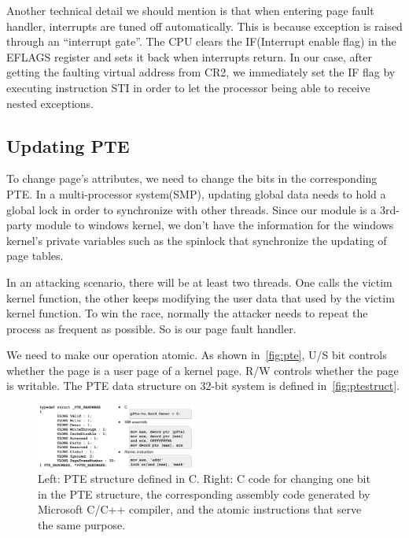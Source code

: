 Another technical detail we should mention is that when entering page fault handler, interrupts are tuned off automatically. This is because exception is raised through an ``interrupt gate''. The CPU clears the IF(Interrupt enable flag) in the EFLAGS register and sets it back when interrupts return. In our case, after getting the faulting virtual address from CR2, we immediately set the IF flag by executing instruction STI in order to let the processor being able to receive nested exceptions.

\subsection{Updating PTE}

To change page's attributes, we need to change the bits in the corresponding PTE. In a multi-processor system(SMP), updating global data needs to hold a global lock in order to synchronize with other threads. Since our module is a 3rd-party module to windows kernel, we don't have the information for the windows kernel's private variables such as the spinlock that synchronize the updating of page tables. 

In an attacking scenario, there will be at least two threads. One calls the victim kernel function, the other keeps modifying the user data that used by the victim kernel function. To win the race, normally the attacker needs to repeat the process as frequent as possible. So is our page fault handler. 

We need to make our operation atomic. As shown in~\autoref{fig:pte}, U/S bit controls whether the page is a user page of a kernel page. R/W controls whether the page is writable. The PTE data structure on 32-bit system is defined in~\autoref{fig:ptestruct}.

%

\begin{figure}[th]
  \includegraphics[width=0.47\textwidth]{figures/ptestructcode}
  \centering
  \caption{Left: PTE structure defined in C. Right: C code for changing one bit in the PTE structure, the corresponding assembly code generated by Microsoft C/C++ compiler, and the atomic instructions that serve the same purpose.}
  \label{fig:ptestruct}
\end{figure}

